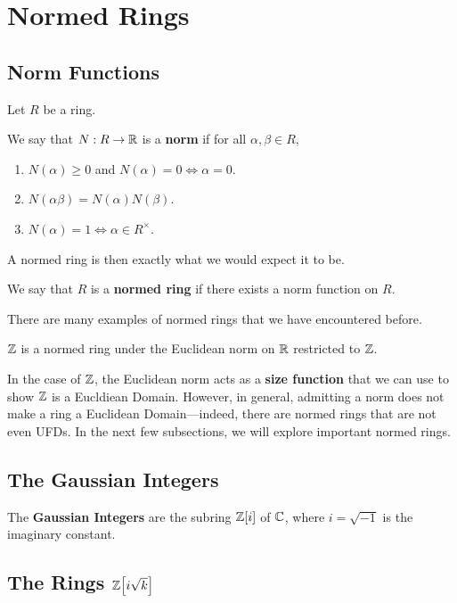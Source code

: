 \section{Normed Rings}\label{Ch2:Sec:Norms}

\subsection{Norm Functions}

Let $R$ be a ring.

\begin{boxdefinition}[Norm]
    We say that $N : R \to \mathbb{R}$ is a \textbf{norm} if for all $\alpha, \beta \in R$,
    \begin{enumerate}[noitemsep]
        \item $N(\alpha) \geq 0$ and $N(\alpha) = 0 \iff \alpha = 0$.
        \item $N(\alpha \beta) = N(\alpha) N(\beta)$.
        \item $N(\alpha) = 1 \iff \alpha \in R^{\times}$.
    \end{enumerate}
\end{boxdefinition}

A normed ring is then exactly what we would expect it to be.

\begin{boxdefinition}
    We say that $R$ is a \textbf{normed ring} if there exists a norm function on $R$.
\end{boxdefinition}

There are many examples of normed rings that we have encountered before.

\begin{boxexample}
    $\mathbb{Z}$ is a normed ring under the Euclidean norm on $\mathbb{R}$ restricted to $\mathbb{Z}$.
\end{boxexample}

In the case of $\mathbb{Z}$, the Euclidean norm acts as a \textbf{size function} that we can use to show $\mathbb{Z}$ is a Eucldiean Domain. However, in general, admitting a norm does not make a ring a Euclidean Domain---indeed, there are normed rings that are not even UFDs. In the next few subsections, we will explore important normed rings.

\subsection{The Gaussian Integers}

\begin{boxdefinition}
    The \textbf{Gaussian Integers} are the subring $\mathbb{Z}\!\left[ i \right]$ of $\mathbb{C}$, where $i = \sqrt{-1}$ is the imaginary constant.
\end{boxdefinition}



\subsection{The Rings $\mathbb{Z}\!\left[ i\sqrt{k} \right]$}


